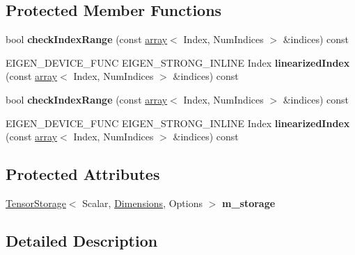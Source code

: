 \subsection*{Protected Member Functions}
\begin{DoxyCompactItemize}
\item 
\mbox{\label{class_eigen_1_1_tensor_a8362c995157473f21e6e5190d428e2c1}} 
bool {\bfseries check\+Index\+Range} (const \hyperlink{class_eigen_1_1array}{array}$<$ Index, Num\+Indices $>$ \&indices) const
\item 
\mbox{\label{class_eigen_1_1_tensor_a5994bdce0e90c9079966a6cb412f8727}} 
E\+I\+G\+E\+N\+\_\+\+D\+E\+V\+I\+C\+E\+\_\+\+F\+U\+NC E\+I\+G\+E\+N\+\_\+\+S\+T\+R\+O\+N\+G\+\_\+\+I\+N\+L\+I\+NE Index {\bfseries linearized\+Index} (const \hyperlink{class_eigen_1_1array}{array}$<$ Index, Num\+Indices $>$ \&indices) const
\item 
\mbox{\label{class_eigen_1_1_tensor_a8362c995157473f21e6e5190d428e2c1}} 
bool {\bfseries check\+Index\+Range} (const \hyperlink{class_eigen_1_1array}{array}$<$ Index, Num\+Indices $>$ \&indices) const
\item 
\mbox{\label{class_eigen_1_1_tensor_a5994bdce0e90c9079966a6cb412f8727}} 
E\+I\+G\+E\+N\+\_\+\+D\+E\+V\+I\+C\+E\+\_\+\+F\+U\+NC E\+I\+G\+E\+N\+\_\+\+S\+T\+R\+O\+N\+G\+\_\+\+I\+N\+L\+I\+NE Index {\bfseries linearized\+Index} (const \hyperlink{class_eigen_1_1array}{array}$<$ Index, Num\+Indices $>$ \&indices) const
\end{DoxyCompactItemize}
\subsection*{Protected Attributes}
\begin{DoxyCompactItemize}
\item 
\mbox{\label{class_eigen_1_1_tensor_a9451958ba44f9289d4d0126584a3379a}} 
\hyperlink{class_eigen_1_1_tensor_storage}{Tensor\+Storage}$<$ Scalar, \hyperlink{struct_eigen_1_1_d_sizes}{Dimensions}, Options $>$ {\bfseries m\+\_\+storage}
\end{DoxyCompactItemize}


\subsection{Detailed Description}
